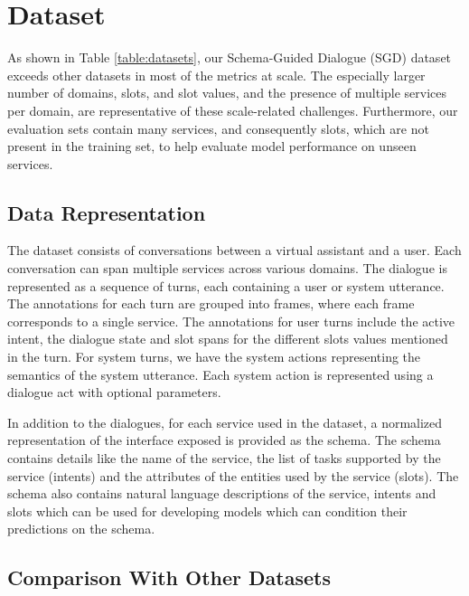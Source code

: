 \section{Dataset}

As shown in Table \ref{table:datasets}, our Schema-Guided Dialogue (SGD) dataset exceeds other datasets in most of the metrics at scale. The especially larger number of domains, slots, and slot values, and the presence of multiple services per domain, are representative of these scale-related challenges. Furthermore, our evaluation sets contain many services, and consequently slots, which are not present in the training set, to help evaluate model performance on unseen services.

\subsection{Data Representation}

The dataset consists of conversations between a virtual assistant and a user. Each conversation can span multiple services across various domains. The dialogue is represented as a sequence of turns, each containing a user or system utterance. The annotations for each turn are grouped into frames, where each frame corresponds to a single service. The annotations for user turns include the active intent, the dialogue state and slot spans for the different slots values mentioned in the turn. For system turns, we have the system actions representing the semantics of the system utterance. Each system action is represented using a dialogue act with optional parameters.

In addition to the dialogues, for each service used in the dataset, a normalized representation of the interface exposed is provided as the schema. The schema contains details like the name of the service, the list of tasks supported by the service (intents) and the attributes of the entities used by the service (slots). The schema also contains natural language descriptions of the service, intents and slots which can be used for developing models which can condition their predictions on the schema.

\subsection{Comparison With Other Datasets}


